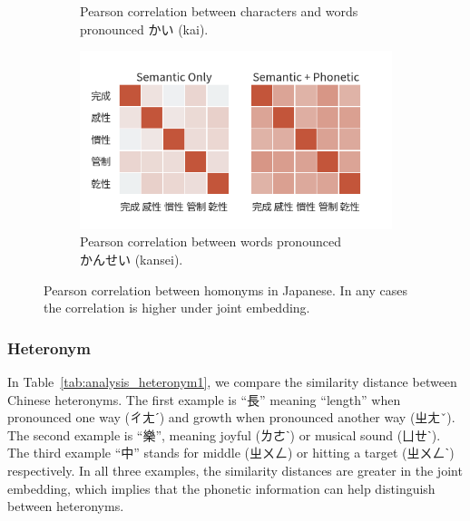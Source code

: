 \begin{CJK}{UTF8}{ipxm}
\begin{figure}[h!]
\begin{subfigure}[b]{0.46\textwidth}
        \caption{Pearson correlation between characters and words pronounced かい (kai).}
        \label{fig:corr_ja2}
    \end{subfigure}
    \begin{subfigure}[b]{0.46\textwidth}
        \centering
        \includegraphics[width=\textwidth]{../images/corr_ja3.png}
        \caption{Pearson correlation between words pronounced \\かんせい (kansei).}
        \label{fig:corr_ja3}
    \end{subfigure}
    \caption[Pearson correlation between homonyms in Japanese]{Pearson correlation between homonyms in Japanese. In any cases the correlation is higher under joint embedding.}
    \label{fig:corr_ja}
\end{figure}
\end{CJK}

\newpage

\subsubsection{Heteronym}

In Table~\ref{tab:analysis_heteronym1}, we compare the similarity distance between Chinese heteronyms.  The first example is ``長'' meaning ``length'' when pronounced one way (ㄔㄤˊ) and growth when pronounced another way (ㄓㄤˇ).  The second example is ``樂'', meaning joyful (ㄌㄜˋ) or musical sound (ㄩㄝˋ).  The third example ``中'' stands for middle (ㄓㄨㄥ) or hitting a target (ㄓㄨㄥˋ) respectively. In all three examples, the similarity distances are greater in the joint embedding, which implies that the phonetic information can help distinguish between heteronyms.

